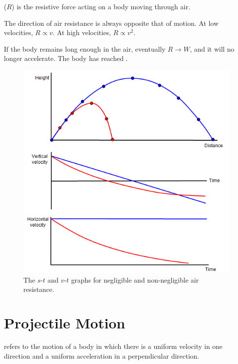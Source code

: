 \begin{definition}
     ($R$) is the resistive force acting on a body moving through air.
\end{definition}

The direction of air resistance is always opposite that of motion. At low velocities, $R \propto v$. At high velocities, $R \propto v^2$.

If the body remains long enough in the air, eventually $R \to W$, and it will no longer accelerate. The body has reached .

\begin{figure}[H]
    \centering
    \includegraphics[scale=0.5]{media/Free Fall.png}
    \caption{The $s$-$t$ and $v$-$t$ graphs for {\color{blue} negligible} and {\color{red}non-negligible} air resistance.\protect\footnotemark}
\end{figure}

\section{Projectile Motion}

\begin{definition}
     refers to the motion of a body in which there is a uniform velocity in one direction and a uniform acceleration in a perpendicular direction.
\end{definition}


